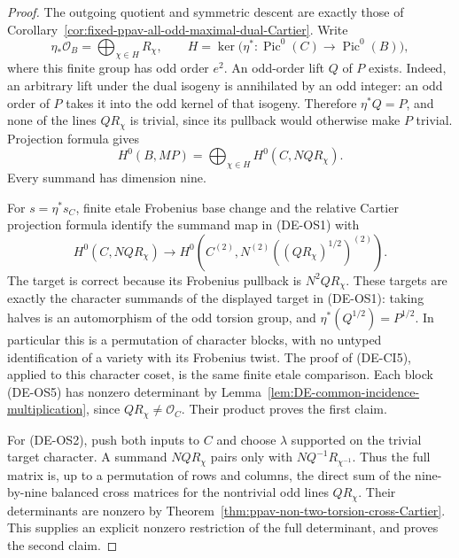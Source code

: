 \begin{proof}
The outgoing quotient and symmetric descent are exactly those of
Corollary~\ref{cor:fixed-ppav-all-odd-maximal-dual-Cartier}.
Write
\[
 \eta_*\mathcal O_B=\bigoplus_{\chi\in H}R_\chi,
 \qquad H=\ker\bigl(\eta^*: \operatorname{Pic}^0(C)
                               \to\operatorname{Pic}^0(B)\bigr),
 \tag{DE-OS3}
\]
where this finite group has odd order \(e^2\).
An odd-order lift \(Q\) of \(P\) exists. Indeed, an arbitrary lift
under the dual isogeny is annihilated by an odd integer: an odd order
of \(P\) takes it into the odd kernel of that isogeny. Therefore
\(\eta^*Q=P\), and none of the lines \(Q R_\chi\) is trivial,
since its pullback would otherwise make \(P\) trivial.
Projection formula gives
\[
 H^0(B,MP)=\bigoplus_{\chi\in H}H^0(C,NQ R_\chi).
 \tag{DE-OS4}
\]
Every summand has dimension nine.

For \(s=\eta^*s_C\), finite etale Frobenius base change and the
relative Cartier projection formula identify the summand map in
(DE-OS1) with
\[
 H^0(C,NQ R_\chi)\longrightarrow
 H^0(C^{(2)},N^{(2)}
                    ((Q R_\chi)^{1/2})^{(2)}).
 \tag{DE-OS5}
\]
The target is correct because its Frobenius pullback is
\(N^2Q R_\chi\). These targets are exactly the character summands
of the displayed target in (DE-OS1): taking halves is an automorphism
of the odd torsion group, and
\(\eta^*(Q^{1/2})=P^{1/2}\). In particular this is a permutation
of character blocks, with no untyped identification of a variety
with its Frobenius twist. The proof of (DE-CI5), applied to this
character coset, is the same finite etale comparison.
Each block (DE-OS5) has nonzero determinant by
Lemma~\ref{lem:DE-common-incidence-multiplication}, since
\(Q R_\chi\ne\mathcal O_C\). Their product proves the first claim.

For (DE-OS2), push both inputs to \(C\) and choose \(\lambda\)
supported on the trivial target character. A summand
\(NQ R_\chi\) pairs only with \(NQ^{-1}R_{\chi^{-1}}\).
Thus the full matrix is, up to a permutation of rows and columns,
the direct sum of the nine-by-nine balanced cross matrices for
the nontrivial odd lines \(Q R_\chi\). Their determinants are
nonzero by Theorem~\ref{thm:ppav-non-two-torsion-cross-Cartier}.
This supplies an explicit nonzero restriction of the full determinant,
and proves the second claim.


\end{proof}

